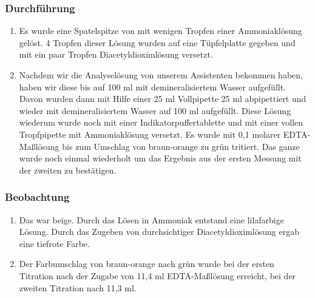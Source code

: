 \documentclass{scrartcl}
\begin{document}
\subsubsection{Durchführung}
\begin{enumerate}[label=\alph*)]
	\item Es wurde eine Spatelspitze von  mit wenigen Tropfen einer Ammoniaklösung gelöst. 4 Tropfen dieser Lösung wurden auf eine Tüpfelplatte gegeben und mit ein paar Tropfen Diacetyldioximlösung versetzt.
	\item Nachdem wir die Analyselösung von unserem Assistenten bekommen haben, haben wir diese bis auf 100 ml mit demineralisiertem Wasser aufgefüllt. Davon wurden dann mit Hilfe einer 25 ml Vollpipette 25 ml abpipettiert und wieder mit demineralisiertem Wasser auf 100 ml aufgefüllt. Diese Lösung wiederum wurde noch mit einer Indikatorpuffertablette und mit einer vollen Tropfpipette mit Ammoniaklösung versetzt. Es wurde mit 0,1 molarer EDTA-Maßlösung bis zum Umschlag von braun-orange zu grün tritiert. Das ganze wurde noch einmal wiederholt um das Ergebnis aus der ersten Messung mit der zweiten zu bestätigen.  
\end{enumerate}
\subsubsection{Beobachtung}
\begin{enumerate}[label=\alph*)]
	\item Das  war beige. Durch das Lösen in Ammoniak entstand eine lilafarbige Lösung. Durch das Zugeben von durchsichtiger Diacetyldioximlösung ergab eine tiefrote Farbe.
	\item Der Farbumschlag von braun-orange nach grün wurde bei der ersten Titration nach der Zugabe von 11,4 ml EDTA-Maßlösung erreicht, bei der zweiten Titration nach 11,3 ml.
\end{enumerate}
\end{document}

